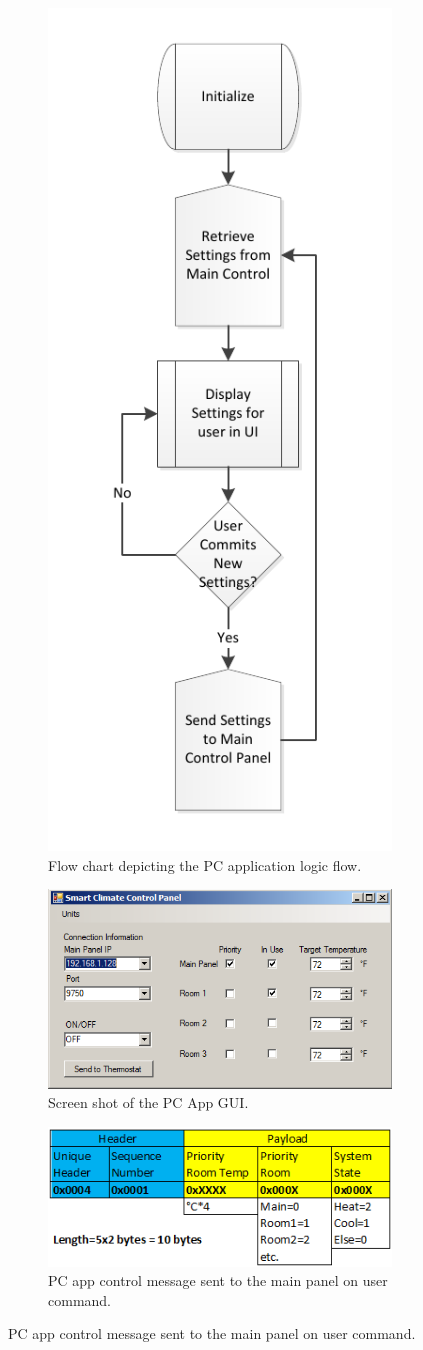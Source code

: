 \begin{figure}
\begin{figure}
\centering
\includegraphics[width=.4\textwidth]{PCapp_flow.pdf}
\caption{Flow chart depicting the PC application logic flow.}
\label{fig:PCapp_flow}
\end{figure}


\begin{figure}
\centering
\includegraphics[width=.9\textwidth]{PC_app.png}
\caption{Screen shot of the PC App GUI.}
\label{fig:PC_app}
\end{figure}

\begin{figure}
\centering
\includegraphics[width=.9\textwidth]{pcapp_message.png}
\caption{PC app control message sent to the main panel on user command.}
\label{fig:pcapp_message}
\end{figure}


\end{figure}
